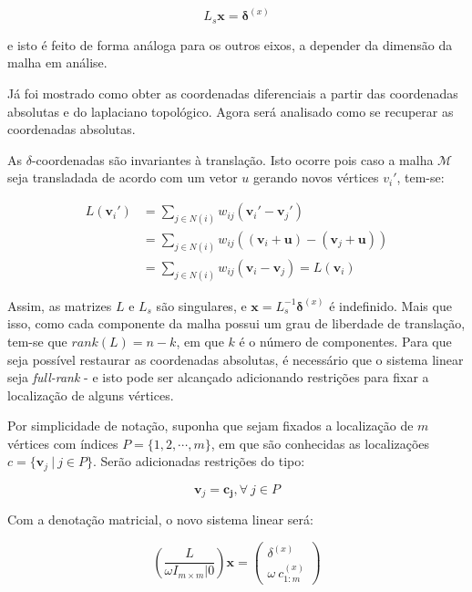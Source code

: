 \begin{equation}
L_s \mathbf{x} = \mathbf{\delta}^{(x)}
\end{equation}

\noindent e isto é feito de forma análoga para os outros eixos, a depender da dimensão da malha em análise.

Já foi mostrado como obter as coordenadas diferenciais a partir das coordenadas absolutas e do laplaciano topológico. Agora será analisado como se recuperar as coordenadas absolutas.

As $\delta$-coordenadas são invariantes à translação. Isto ocorre pois caso a malha $\mathcal{M}$ seja transladada de acordo com um vetor $u$ gerando novos vértices $v_i'$, tem-se:

\begin{align*}
L(\mathbf{v}_i') &= \sum_{j \in N(i)} w_{ij} (\mathbf{v}_i' - \mathbf{v}_j')\\ 
 &= \sum_{j \in N(i)} w_{ij} ((\mathbf{v}_i + \mathbf{u})  - (\mathbf{v}_j + \mathbf{u}))\\ 
 &= \sum_{j \in N(i)} w_{ij} (\mathbf{v}_i - \mathbf{v}_j) = L(\mathbf{v}_i)
\end{align*}

Assim, as matrizes $L$ e $L_s$ são singulares, e $\mathbf{x} = L_s^{-1} \mathbf{\delta}^{(x)}$ é indefinido. Mais que isso, como cada componente da malha possui um grau de liberdade de translação, tem-se que $rank(L) = n - k$, em que $k$ é o número de componentes. Para que seja possível restaurar as coordenadas absolutas, é necessário que o sistema linear seja \textit{full-rank} - e isto pode ser alcançado adicionando restrições para fixar a localização de alguns vértices.

Por simplicidade de notação, suponha que sejam fixados a localização de $m$ vértices com índices $P = \{1, 2, \cdots, m\}$, em que são conhecidas as localizações $c = \{\mathbf{v}_j\ |\ j \in P\}$. Serão adicionadas restrições do tipo:

$$\mathbf{v}_j = \mathbf{c_j}, \forall\ j \in P$$

Com a denotação matricial, o novo sistema linear será:

\begin{equation}\label{eq:sisrecover}
\left( \frac{L}{\omega I_{m \times m} | 0} \right) \mathbf{x} = \begin{pmatrix}
\delta^{(x)}\\
\omega\ c_{1:m}^{(x)}
\end{pmatrix}
\end{equation}

